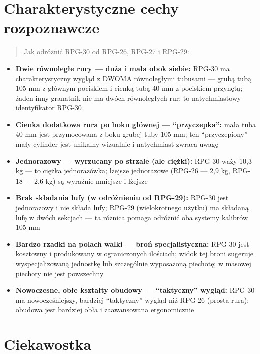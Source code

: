 \documentclass[12pt,openany,oneside]{book}
\providecommand{\tightlist}{%
  \setlength{\itemsep}{0pt}\setlength{\parskip}{0pt}}
\begin{document}
\section{Charakterystyczne cechy
rozpoznawcze}\label{charakterystyczne-cechy-rozpoznawcze-74}

\begin{quote}
Jak odróżnić RPG-30 od RPG-26, RPG-27 i RPG-29:
\end{quote}

\begin{itemize}
\tightlist
\item
  \textbf{Dwie równoległe rury --- duża i mała obok siebie:} RPG-30 ma
  charakterystyczny wygląd z DWOMA równoległymi tubusami --- grubą tubą
  105 mm z głównym pociskiem i cienką tubą 40 mm z pociskiem-przynętą;
  żaden inny granatnik nie ma dwóch równoległych rur; to natychmiastowy
  identyfikator RPG-30
\item
  \textbf{Cienka dodatkowa rura po boku głównej --- ``przyczepka'':}
  mała tuba 40 mm jest przymocowana z boku grubej tuby 105 mm; ten
  ``przyczepiony'' mały cylinder jest unikalny wizualnie i natychmiast
  zwraca uwagę
\item
  \textbf{Jednorazowy --- wyrzucany po strzale (ale ciężki):} RPG-30
  waży 10,3 kg --- to ciężka jednorazówka; lżejsze jednorazowe (RPG-26
  --- 2,9 kg, RPG-18 --- 2,6 kg) są wyraźnie mniejsze i lżejsze
\item
  \textbf{Brak składania lufy (w odróżnieniu od RPG-29):} RPG-30 jest
  jednorazowy i nie składa lufy; RPG-29 (wielokrotnego użytku) ma
  składaną lufę w dwóch sekcjach --- ta różnica pomaga odróżnić oba
  systemy kalibrów 105 mm
\item
  \textbf{Bardzo rzadki na polach walki --- broń specjalistyczna:}
  RPG-30 jest kosztowny i produkowany w ograniczonych ilościach; widok
  tej broni sugeruje wyspecjalizowaną jednostkę lub szczególnie
  wyposażoną piechotę; w masowej piechoty nie jest powszechny
\item
  \textbf{Nowoczesne, obłe kształty obudowy --- ``taktyczny'' wygląd:}
  RPG-30 ma nowocześniejszy, bardziej ``taktyczny'' wygląd niż RPG-26
  (prosta rura); obudowa jest bardziej obła i zaawansowana ergonomicznie
\end{itemize}

\section{Ciekawostka}\label{ciekawostka-74}
\end{document}
